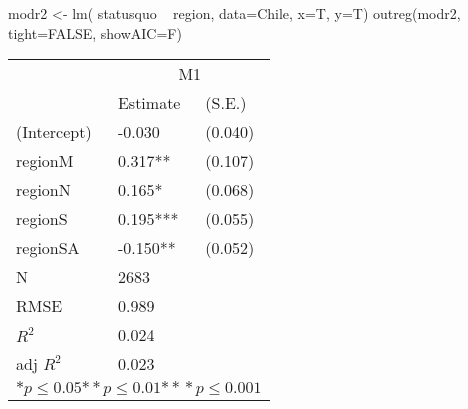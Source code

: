 \begin{Schunk}
\begin{Sinput}
 modr2 <- lm( statusquo ~ region, data=Chile, x=T, y=T)
 outreg(modr2, tight=FALSE, showAIC=F)
\end{Sinput}
\begin{tabular}{*{3}{l}}
\hline
                  & \multicolumn{2}{c}{M1}   \tabularnewline
                   &Estimate  &(S.E.)  \tabularnewline
 \hline
 \hline
   (Intercept)     &-0.030   &   (0.040) \tabularnewline
   regionM         &0.317**   &   (0.107) \tabularnewline
   regionN         &0.165*   &   (0.068) \tabularnewline
   regionS         &0.195***   &   (0.055) \tabularnewline
   regionSA        &-0.150**   &   (0.052) \tabularnewline
 \hline
 N                 &2683       &        \tabularnewline
 RMSE             &0.989         & \tabularnewline
 $R^2$             &0.024         & \tabularnewline
 adj $R^2$         &0.023         & \tabularnewline
 \hline
\hline
 
 \multicolumn{3}{c}{${*  p}\le 0.05$${*\!\!*  p}\le 0.01$${*\!\!*\!\!*  p}\le 0.001$}\tabularnewline
 \end{tabular}\end{Schunk}
